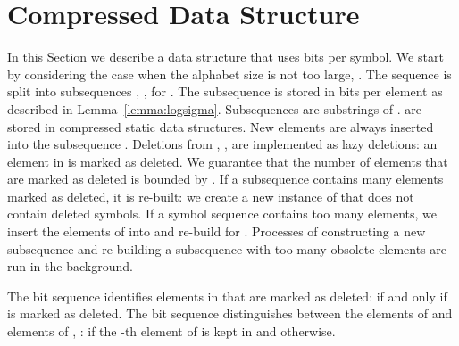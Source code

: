 \documentclass[11pt]{article}\usepackage{fullpage}
\newcommand{\no}[1]{}
\begin{document}
\section{Compressed Data Structure}
\label{sec:compr}
In this Section we describe a data structure that uses  bits per symbol. We start by considering the case when the alphabet size is not too large, .
The sequence  is split into subsequences , ,   for . 
The subsequence  is stored in  bits per element as described in Lemma~\ref{lemma:logsigma}. 
Subsequences  are substrings of .  are stored in compressed static data structures. New elements are always inserted into the subsequence .  Deletions from , , are implemented as lazy deletions: an element in  is marked as deleted. We guarantee that the number of elements that are marked as deleted  is bounded by 
. If a subsequence  contains many elements marked as deleted, it is re-built: we create a new instance of  
that does not contain deleted symbols. If a symbol sequence  contains too many elements, we insert the elements of  into 
 and re-build  for .
 Processes of constructing a new subsequence and re-building a subsequence with too many obsolete elements are run 
in the background.



\no{As follows from the above high-level description,  are subsequences (but not substrings!) of : if an element  precedes , then  precedes  in . But the index of the subsequence  that contains an element  
depends only on the time when it was inserted and does not depend on its position in . Thus  subsequences can be interspersed in an arbitrary way. }


The bit sequence  identifies elements in  that are marked as deleted:  if and only if   is marked as deleted. 
The bit sequence  distinguishes between the elements of  and elements of , :  if the -th element of  is kept in  and  otherwise. 
\end{document}
